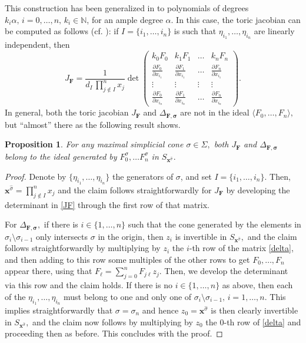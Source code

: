\documentclass[a4paper,11pt]{amsart}
\newcommand{\N}{\mathbb{N}}
\newcommand{\bfx}{{\boldsymbol{x}}}
\newcommand{\bfsigma}{{\boldsymbol{\sigma}}}
\newcommand{\bfF}{{\boldsymbol{F}}}
\newcounter{thm}
\numberwithin{thm}{section}
\numberwithin{equation}{section}
\theoremstyle{definition}
\theoremstyle{plain}
\newtheorem{proposition}[thm]{Proposition}
\begin{document}
This construction has been generalized in \cite{CDS98} to polynomials  of degrees $k_i\alpha,\, i=0,\ldots, n,\, k_i\in\N$, for an ample degree $\alpha$.
In this case, the toric jacobian can be computed as follows (cf. \cite[(1.7)]{CDS98}): if $I=\{i_1,\ldots, i_n\}$ is such that 
$\eta_{i_1},\ldots, \eta_{i_n}$ are linearly independent, then
\begin{equation}\label{JF}
J_\bfF=\frac{1}{d_I\,\prod_{j\notin I}^n x_{j}}\det\left(\begin{array}{cccc}
k_0F_0& k_1F_1&\ldots & k_nF_n\\
\frac{\partial F_0}{\partial x_{i_1}} & \frac{\partial F_1}{\partial x_{i_1}}& \ldots &\frac{\partial F_n}{\partial x_{i_1}} \\
\vdots &\vdots& \vdots&\vdots\\
\frac{\partial F_0}{\partial x_{i_n}}&\frac{\partial F_1}{\partial x_{i_n}}& \ldots & \frac{\partial F_n}{\partial x_{i_n}}
\end{array}\right).
\end{equation}
In general, both the toric jacobian $J_\bfF$ and $\Delta_{\bfF,\bfsigma}$  are  not in the ideal $\langle F_0,\ldots, F_n\rangle,$ but ``almost'' there as the following result shows. 

\begin{proposition}\label{oxi}
For any maximal simplicial cone $\sigma \in\Sigma,$ both $J_\bfF$ and $\Delta_{\bfF,\bfsigma}$ belong to the ideal generated by $F_0^\sigma,\ldots F_ n^\sigma$ in $S_{\bfx^{\widehat{\sigma}}}.$
\end{proposition}

\begin{proof}
Denote by $\{\eta_{i_1},\ldots, \eta_{i_n}\}$ the generators of $\sigma$, and set $I=\{i_1,\ldots, i_n\}.$ Then, $\bfx^{\widehat{\sigma}}=\prod_{j\notin I}^n x_{j}$ and the claim follows straightforwardly for $J_\bfF$ by developing the determinant in \eqref{JF} through the first row of that matrix.

For $\Delta_{\bfF,\bfsigma},$ if there is $i\in\{1,\ldots, n\}$ such that the cone generated by the elements in $\sigma_i\setminus\sigma_{i-1}$ only intersects $\sigma$ in the origin, then $z_i$ is invertible in  $S_{\bfx^{\widehat{\sigma}}},$ and the claim follows straightforwardly by multiplying by $z_i$ the $i$-th row of the matrix \eqref{delta}, and then adding to this row some multiples of the other rows to get $F_0,\ldots, F_n$ appear there, using that $F_\ell=\sum_{j=0}^{n} F_{j\ell}z_j.$ Then, we develop  the determinant via this row and the claim holds. If there is no $i\in\{1,\ldots, n\}$  as above, then each of the $\eta_{i_1},\ldots, \eta_{i_n}$ must belong to one and only one of $\sigma_i\setminus\sigma_{i-1},\, i=1,\ldots, n.$ This implies straightforwardly that  $\sigma=\sigma_n$ and hence $z_0=\bfx^{\widehat{\sigma}}$ is then clearly invertible in $S_{\bfx^{\widehat{\sigma}}},$ and the claim now follows by multiplying by $z_0$ the $0$-th row of \eqref{delta} and proceeding then as before. This concludes with the proof.
\end{proof}
\end{document}
